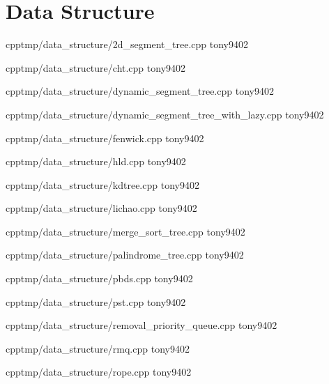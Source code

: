 \section{Data Structure}


{}
{}
{}
{cpp}{tmp/data_structure/2d_segment_tree.cpp}
{tony9402}



{}
{}
{}
{cpp}{tmp/data_structure/cht.cpp}
{tony9402}



{}
{}
{}
{cpp}{tmp/data_structure/dynamic_segment_tree.cpp}
{tony9402}



{}
{}
{}
{cpp}{tmp/data_structure/dynamic_segment_tree_with_lazy.cpp}
{tony9402}



{}
{}
{}
{cpp}{tmp/data_structure/fenwick.cpp}
{tony9402}



{}
{}
{}
{cpp}{tmp/data_structure/hld.cpp}
{tony9402}



{}
{}
{}
{cpp}{tmp/data_structure/kdtree.cpp}
{tony9402}



{}
{}
{}
{cpp}{tmp/data_structure/lichao.cpp}
{tony9402}



{}
{}
{}
{cpp}{tmp/data_structure/merge_sort_tree.cpp}
{tony9402}



{}
{}
{}
{cpp}{tmp/data_structure/palindrome_tree.cpp}
{tony9402}



{}
{}
{}
{cpp}{tmp/data_structure/pbds.cpp}
{tony9402}



{}
{}
{}
{cpp}{tmp/data_structure/pst.cpp}
{tony9402}



{}
{}
{}
{cpp}{tmp/data_structure/removal_priority_queue.cpp}
{tony9402}



{}
{}
{}
{cpp}{tmp/data_structure/rmq.cpp}
{tony9402}



{}
{}
{}
{cpp}{tmp/data_structure/rope.cpp}
{tony9402}



